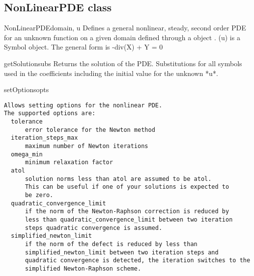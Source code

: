 \subsection{NonLinearPDE class}
\begin{classdesc}{NonLinearPDE}{domain, u}
Defines a general nonlinear, steady, second order PDE for an unknown function  on a given domain defined through a \Domain object . \var(u) is a Symbol object.
The general form is -div(X) + Y = 0 
\end{classdesc}
\iffalse
\begin{methoddesc}[NonLinearPDE]{concatenateRow}{}
test
\end{methoddesc}
\begin{methoddesc}[NonLinearPDE]{createCoefficient}{}
test
\end{methoddesc}
\begin{methoddesc}[NonLinearPDE]{getUnknownSymbol}{}
test
\end{methoddesc}
\begin{methoddesc}[NonLinearPDE]{getLinearSolverOptions}{}
test
\end{methoddesc}
\begin{methoddesc}[NonLinearPDE]{getLinearPDE}{}
test
\end{methoddesc}
\begin{methoddesc}[NonLinearPDE]{getNumSolutions}{}
test
\end{methoddesc}
\begin{methoddesc}[NonLinearPDE]{getShapeOfCoefficient}{}
test
\end{methoddesc}
\begin{methoddesc}[NonLinearPDE]{getCoefficient}{}
test
\end{methoddesc}
\begin{methoddesc}[NonLinearPDE]{getSensitivity}{}
test
\end{methoddesc}
\fi
\begin{methoddesc}[NonLinearPDE]{getSolution}{subs}
Returns the solution of the PDE. Substitutions for all symbols used in the coefficients including the initial value for the unknown *u*.
\end{methoddesc}
\pagebreak
\begin{methoddesc}[NonLinearPDE]{setOptions}{opts}
\begin{verbatim}
Allows setting options for the nonlinear PDE.
The supported options are:
  tolerance
      error tolerance for the Newton method
  iteration_steps_max
      maximum number of Newton iterations
  omega_min
      minimum relaxation factor
  atol
      solution norms less than atol are assumed to be atol.
      This can be useful if one of your solutions is expected to
      be zero.
  quadratic_convergence_limit
      if the norm of the Newton-Raphson correction is reduced by
      less than quadratic_convergence_limit between two iteration
      steps quadratic convergence is assumed.
  simplified_newton_limit
      if the norm of the defect is reduced by less than
      simplified_newton_limit between two iteration steps and
      quadratic convergence is detected, the iteration switches to the
      simplified Newton-Raphson scheme.
\end{verbatim}

\end{methoddesc}

